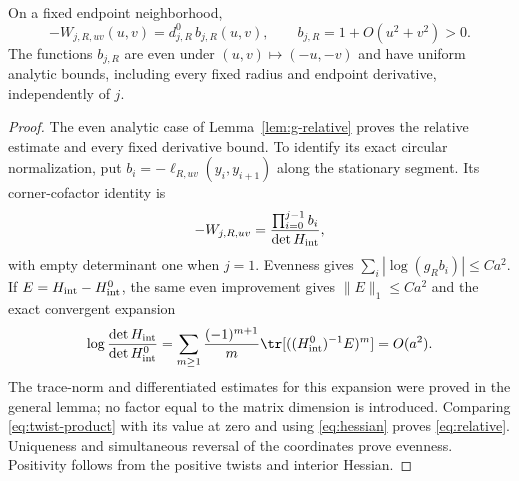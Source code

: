 \begin{lemma}\label{lem:relative}
On a fixed endpoint neighborhood,
\begin{equation}\label{eq:relative}
 -W_{j,R,uv}(u,v)=d^0_{j,R}\,b_{j,R}(u,v),\qquad
 b_{j,R}=1+O(u^2+v^2)>0.
\end{equation}
The functions $b_{j,R}$ are even under $(u,v)\mapsto(-u,-v)$ and
have uniform analytic bounds, including every fixed radius and endpoint
derivative, independently of $j$.
\end{lemma}
\begin{proof}
The even analytic case of Lemma~\ref{lem:g-relative} proves the
relative estimate and every fixed derivative bound. To identify its
exact circular normalization, put
$b_i=-\ell_{R,uv}(y_i,y_{i+1})$ along the stationary segment. Its
corner-cofactor identity is
\begin{equation}\label{eq:twist-product}
 -W_{j,R,uv}=\frac{\prod_{i=0}^{j-1}b_i}{\det H_{\rm int}},
\end{equation}
with empty determinant one when $j=1$. Evenness gives
$\sum_i|\log(g_Rb_i)|\le Ca^2$. If
$E=H_{\rm int}-H^0_{\rm int}$, the same even improvement gives
$\|E\|_1\le Ca^2$ and the exact convergent expansion
\begin{equation}\label{eq:log-det}
 \log\frac{\det H_{\rm int}}{\det H^0_{\rm int}}
 =\sum_{m\ge1}\frac{(-1)^{m+1}}m
   \tr[((H^0_{\rm int})^{-1}E)^m]=O(a^2).
\end{equation}
The trace-norm and differentiated estimates for this expansion were
proved in the general lemma; no factor equal to the matrix dimension
is introduced. Comparing \eqref{eq:twist-product} with its value at
zero and using \eqref{eq:hessian} proves \eqref{eq:relative}.
Uniqueness and simultaneous reversal of the coordinates prove evenness.
Positivity follows from the positive twists and interior Hessian.
\end{proof}

